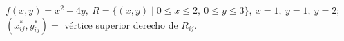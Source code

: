 \item $f(x, y) = x^2 + 4y, \ R = \{(x, y) \mid 0 \le x \le 2, \ 0 \le y \le 3\}, \ x = 1, \ y = 1, \ y = 2$; \\ $(x_{ij}^*, y_{ij}^*) =$ vértice superior derecho de $R_{ij}$.
